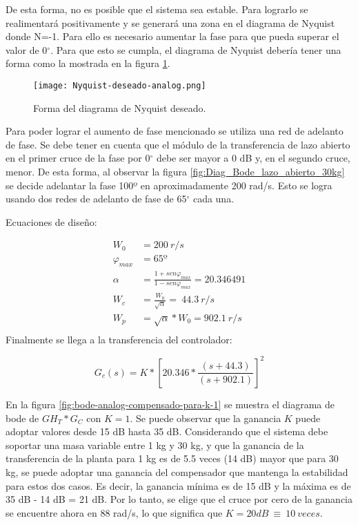 \noindent De esta forma, no es posible que el sistema sea estable. Para lograrlo se realimentar\'{a} positivamente y se generar\'{a} una zona en el diagrama de Nyquist donde N=-1. Para ello es necesario aumentar la fase para que pueda superar el valor de 0$\mathrm{{}^\circ}$.  Para que esto se cumpla, el diagrama de Nyquist deber\'{i}a tener una forma como la  mostrada en la figura \ref{fig:nyquist-deseado-analog}.

\begin{figure}[H]
	\centering
	\texttt{[image: Nyquist-deseado-analog.png]}
	\caption{Forma del diagrama de Nyquist deseado.}
	\label{fig:nyquist-deseado-analog}
\end{figure}

\noindent Para poder lograr el aumento de fase mencionado se utiliza una red de adelanto de fase. Se debe tener en cuenta que el m\'{o}dulo de la transferencia de lazo abierto en el primer cruce de la fase por 0$\mathrm{{}^\circ}$ debe ser mayor a 0 dB y, en el segundo cruce, menor. De esta forma, al observar la figura \ref{fig:Diag_Bode_lazo_abierto_30kg} se decide adelantar la fase 100º en aproximadamente 200 rad/s. Esto se logra usando dos redes de adelanto de fase de 65$\mathrm{{}^\circ}$ cada una.

\noindent Ecuaciones de dise\~{n}o:

\begin{equation*}
	\begin{aligned}
		W_0 &=200\ r/s\\
		{\varphi }_{max} &=65\textrm{º}\\
		\alpha &=\frac{1+sen{\varphi }_{max}}{1-sen{\varphi }_{max}}=20.346491\\
		W_c &=\frac{W_0}{\sqrt{\alpha }}=\ 44.3\ r/s\\
		W_p &=\sqrt{\alpha }*W_0=902.1\ r/s\\
	\end{aligned}
\end{equation*} 
\noindent Finalmente se llega a la transferencia del controlador:

\begin{equation}  
	G_c(s)=K*{[20.346*\frac{(s+44.3)}{(s+902.1)}]}^2
\end{equation} 

\noindent En la figura \ref{fig:bode-analog-compensado-para-k-1} se muestra el diagrama de bode de ${GH}_T*G_C$ con $K=1$. Se puede observar que la ganancia $K$ puede adoptar valores desde 15 dB hasta 35 dB. Considerando que el sistema debe soportar una masa variable entre 1 kg y 30 kg, y que la ganancia de la transferencia de la planta para 1 kg es de 5.5 veces (14 dB) mayor que para 30 kg, se puede adoptar una ganancia del compensador que mantenga la estabilidad para estos dos casos. Es decir, la ganancia m\'{i}nima es de 15 dB y la m\'{a}xima es de 35 dB - 14 dB = 21 dB. Por lo tanto, se elige que el cruce por cero de la ganancia se encuentre ahora en 88 rad/s, lo que significa que $K=20dB\ \equiv \ 10\ veces$.


